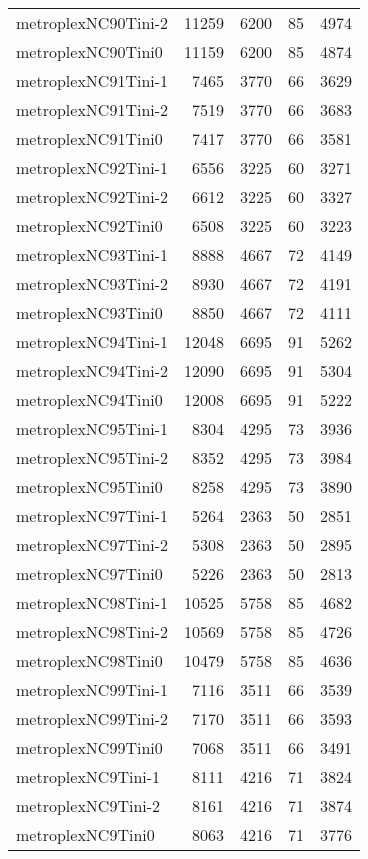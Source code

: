 \begin{longtable}{lrrrr}
metroplexNC90Tini-2 & 11259 & 6200 & 85 & 4974 \\
metroplexNC90Tini0 & 11159 & 6200 & 85 & 4874 \\
metroplexNC91Tini-1 & 7465 & 3770 & 66 & 3629 \\
metroplexNC91Tini-2 & 7519 & 3770 & 66 & 3683 \\
metroplexNC91Tini0 & 7417 & 3770 & 66 & 3581 \\
metroplexNC92Tini-1 & 6556 & 3225 & 60 & 3271 \\
metroplexNC92Tini-2 & 6612 & 3225 & 60 & 3327 \\
metroplexNC92Tini0 & 6508 & 3225 & 60 & 3223 \\
metroplexNC93Tini-1 & 8888 & 4667 & 72 & 4149 \\
metroplexNC93Tini-2 & 8930 & 4667 & 72 & 4191 \\
metroplexNC93Tini0 & 8850 & 4667 & 72 & 4111 \\
metroplexNC94Tini-1 & 12048 & 6695 & 91 & 5262 \\
metroplexNC94Tini-2 & 12090 & 6695 & 91 & 5304 \\
metroplexNC94Tini0 & 12008 & 6695 & 91 & 5222 \\
metroplexNC95Tini-1 & 8304 & 4295 & 73 & 3936 \\
metroplexNC95Tini-2 & 8352 & 4295 & 73 & 3984 \\
metroplexNC95Tini0 & 8258 & 4295 & 73 & 3890 \\
metroplexNC97Tini-1 & 5264 & 2363 & 50 & 2851 \\
metroplexNC97Tini-2 & 5308 & 2363 & 50 & 2895 \\
metroplexNC97Tini0 & 5226 & 2363 & 50 & 2813 \\
metroplexNC98Tini-1 & 10525 & 5758 & 85 & 4682 \\
metroplexNC98Tini-2 & 10569 & 5758 & 85 & 4726 \\
metroplexNC98Tini0 & 10479 & 5758 & 85 & 4636 \\
metroplexNC99Tini-1 & 7116 & 3511 & 66 & 3539 \\
metroplexNC99Tini-2 & 7170 & 3511 & 66 & 3593 \\
metroplexNC99Tini0 & 7068 & 3511 & 66 & 3491 \\
metroplexNC9Tini-1 & 8111 & 4216 & 71 & 3824 \\
metroplexNC9Tini-2 & 8161 & 4216 & 71 & 3874 \\
metroplexNC9Tini0 & 8063 & 4216 & 71 & 3776 \\
\end{longtable}
